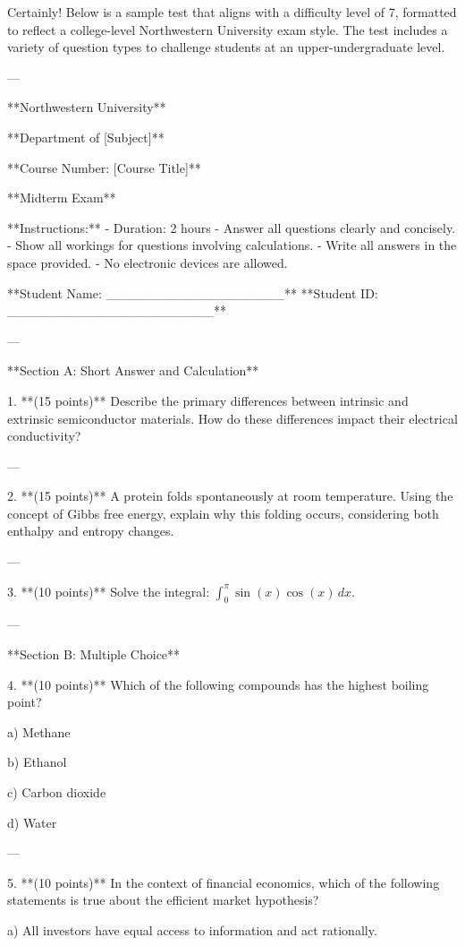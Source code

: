 \documentclass{article}
\begin{document}
Certainly! Below is a sample test that aligns with a difficulty level of 7, formatted to reflect a college-level Northwestern University exam style. The test includes a variety of question types to challenge students at an upper-undergraduate level. 

---

**Northwestern University**

**Department of [Subject]**

**Course Number: [Course Title]**

**Midterm Exam**

**Instructions:**
- Duration: 2 hours
- Answer all questions clearly and concisely.
- Show all workings for questions involving calculations.
- Write all answers in the space provided.
- No electronic devices are allowed.

**Student Name: ___________________**
**Student ID: ______________________**

---

**Section A: Short Answer and Calculation**

1. **(15 points)** Describe the primary differences between intrinsic and extrinsic semiconductor materials. How do these differences impact their electrical conductivity?

---

2. **(15 points)** A protein folds spontaneously at room temperature. Using the concept of Gibbs free energy, explain why this folding occurs, considering both enthalpy and entropy changes.

---

3. **(10 points)** Solve the integral: \(\int_{0}^{\pi} \sin(x) \cos(x) \, dx\).

---

**Section B: Multiple Choice**

4. **(10 points)** Which of the following compounds has the highest boiling point?
   
    a) Methane
   
    b) Ethanol
   
    c) Carbon dioxide
   
    d) Water

---

5. **(10 points)** In the context of financial economics, which of the following statements is true about the efficient market hypothesis?

    a) All investors have equal access to information and act rationally.
    
\end{document}
